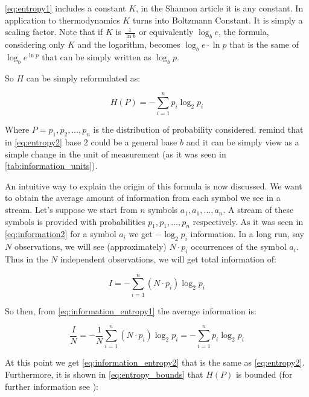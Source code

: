 \documentclass[12pt, a4paper]{report}
\begin{document}
\autoref{eq:entropy1} includes a constant \(K\), in the Shannon article it is any constant. In application to thermodynamics \(K\)
turns into Boltzmann Constant. It is simply a scaling factor. Note that if \(K\) is \(\frac{1}{\ln b}\) or equivalently
\(\log_b e\), the formula, considering only \(K\) and the logarithm, becomes \(\log_b e \cdot \ln p\) that is the same of
\(\log_b e^{\ln p}\) that can be simply written as \(\log_b p\).

So \(H\) can be simply reformulated as:

\begin{equation} \label{eq:entropy2}
  H(P) = - \sum_{i = 1}^{n} p_i \log_2 p_i
\end{equation}

Where \(P = {p_1, p_2, \dots, p_n}\) is the distribution of probability considered.
remind that in \autoref{eq:entropy2} base \(2\) could be a general base \(b\) and it can be simply view as a simple change in the
unit of measurement (as it was seen in \autoref{tab:information_units}).

An intuitive way to explain the origin of this formula is now discussed. We want to obtain the average amount of information from
each symbol we see in a stream. Let's suppose we start from \(n\) symbols \(a_1, a_1, \dots, a_n\).
A stream of these symbols is provided with probabilities \(p_1, p_1, \dots, p_n\) respectively.
As it was seen in \autoref{eq:information2} for a symbol \(a_i\) we get \(-\log_2 p_i\) information.
In a long run, say \(N\) observations, we will see (approximately) \(N \cdot p_i\) occurrences of the symbol \(a_i\).
Thus in the \(N\) independent observations, we will get total information of:

\begin{equation} \label{eq:information_entropy1}
  I = - \sum_{i = 1}^n (N \cdot p_i) \log_2 p_i
\end{equation}

So then, from \autoref{eq:information_entropy1} the average information is:

\begin{equation} \label{eq:information_entropy2}
  \frac{I}{N} = - \frac{1}{N} \sum_{i = 1}^n (N \cdot p_i) \log_2 p_i = - \sum_{i = 1}^n p_i \log_2 p_i
\end{equation}

At this point we get \autoref{eq:information_entropy2} that is the same as \autoref{eq:entropy2}.
Furthermore, it is shown in \autoref{eq:entropy_bounds} that \(H(P)\) is bounded (for further information see
\cite{AnIntroductionToInformationTheoryAndEntropy}):
\end{document}
